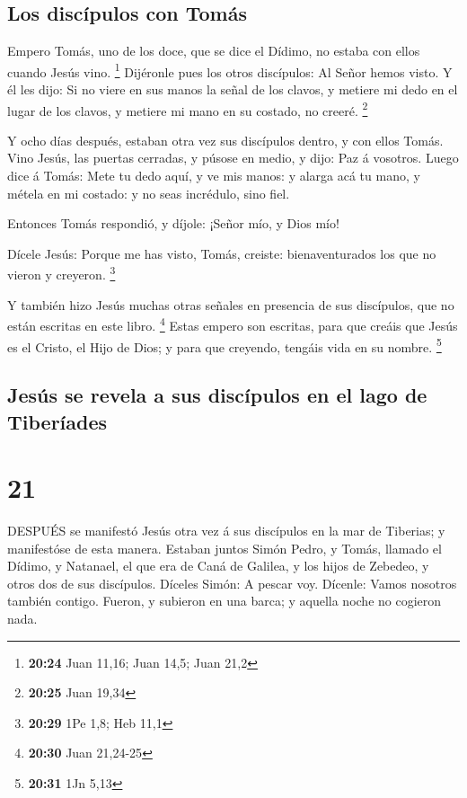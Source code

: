 \hypertarget{los-discuxedpulos-con-tomuxe1s}{%
\subsection{Los discípulos con
Tomás}\label{los-discuxedpulos-con-tomuxe1s}}

 Empero Tomás, uno de los doce, que se dice el Dídimo, no
estaba con ellos cuando Jesús vino. \footnote{\textbf{20:24} Juan 11,16;
  Juan 14,5; Juan 21,2}  Dijéronle pues los otros
discípulos: Al Señor hemos visto. Y él les dijo: Si no viere en sus
manos la señal de los clavos, y metiere mi dedo en el lugar de los
clavos, y metiere mi mano en su costado, no creeré. \footnote{\textbf{20:25}
  Juan 19,34}

 Y ocho días después, estaban otra vez sus discípulos
dentro, y con ellos Tomás. Vino Jesús, las puertas cerradas, y púsose en
medio, y dijo: Paz á vosotros.  Luego dice á Tomás: Mete tu
dedo aquí, y ve mis manos: y alarga acá tu mano, y métela en mi costado:
y no seas incrédulo, sino fiel.

 Entonces Tomás respondió, y díjole: ¡Señor mío, y Dios
mío!

 Dícele Jesús: Porque me has visto, Tomás, creiste:
bienaventurados los que no vieron y creyeron. \footnote{\textbf{20:29}
  1Pe 1,8; Heb 11,1}

 Y también hizo Jesús muchas otras señales en presencia de
sus discípulos, que no están escritas en este libro. \footnote{\textbf{20:30}
  Juan 21,24-25}  Estas empero son escritas, para que
creáis que Jesús es el Cristo, el Hijo de Dios; y para que creyendo,
tengáis vida en su nombre. \footnote{\textbf{20:31} 1Jn 5,13}

\hypertarget{jesuxfas-se-revela-a-sus-discuxedpulos-en-el-lago-de-tiberuxedades}{%
\subsection{Jesús se revela a sus discípulos en el lago de
Tiberíades}\label{jesuxfas-se-revela-a-sus-discuxedpulos-en-el-lago-de-tiberuxedades}}

\hypertarget{section-20}{%
\section{21}\label{section-20}}

 DESPUÉS se manifestó Jesús otra vez á sus discípulos en la
mar de Tiberias; y manifestóse de esta manera.  Estaban
juntos Simón Pedro, y Tomás, llamado el Dídimo, y Natanael, el que era
de Caná de Galilea, y los hijos de Zebedeo, y otros dos de sus
discípulos.  Díceles Simón: A pescar voy. Dícenle: Vamos
nosotros también contigo. Fueron, y subieron en una barca; y aquella
noche no cogieron nada.

